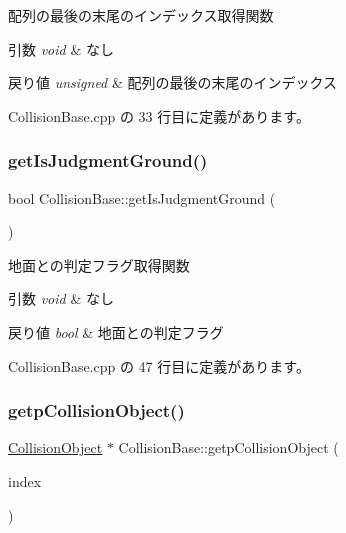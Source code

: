 配列の最後の末尾のインデックス取得関数 


\begin{DoxyParams}{引数}
{\em void} & なし \\
\hline
\end{DoxyParams}

\begin{DoxyRetVals}{戻り値}
{\em unsigned} & 配列の最後の末尾のインデックス \\
\hline
\end{DoxyRetVals}


 Collision\+Base.\+cpp の 33 行目に定義があります。

\mbox{\label{class_collision_base_a7b9cd927976308f8719f3becc03b99a1}} 
\subsubsection{\texorpdfstring{get\+Is\+Judgment\+Ground()}{getIsJudgmentGround()}}
{\footnotesize\ttfamily bool Collision\+Base\+::get\+Is\+Judgment\+Ground (\begin{DoxyParamCaption}{ }\end{DoxyParamCaption})}



地面との判定フラグ取得関数 


\begin{DoxyParams}{引数}
{\em void} & なし \\
\hline
\end{DoxyParams}

\begin{DoxyRetVals}{戻り値}
{\em bool} & 地面との判定フラグ \\
\hline
\end{DoxyRetVals}


 Collision\+Base.\+cpp の 47 行目に定義があります。

\mbox{\label{class_collision_base_a7d5e65d7112a60a98b5557eb5be0ba94}} 
\subsubsection{\texorpdfstring{getp\+Collision\+Object()}{getpCollisionObject()}}
{\footnotesize\ttfamily \mbox{\hyperlink{class_collision_object}{Collision\+Object}} $\ast$ Collision\+Base\+::getp\+Collision\+Object (\begin{DoxyParamCaption}\item[{unsigned}]{index }\end{DoxyParamCaption})}



